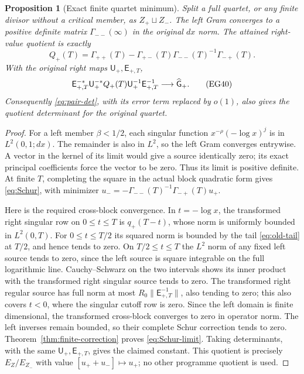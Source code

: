 \documentclass[11pt]{article}
\newtheorem{proposition}[theorem]{Proposition}
\newcommand{\U}{\mathsf U}\newcommand{\E}{\mathsf E}
\begin{document}
\begin{proposition}[Exact finite quartet minimum]\label{prop:left-minimum}
Split a full quartet, or any finite divisor without a critical member,
as $Z_+\sqcup Z_-$. The left Gram converges to a positive definite
matrix $\Gamma_{--}(\infty)$ in the original $dx$ norm. The attained
right-value quotient is exactly
\[
 Q_+(T)=\Gamma_{++}(T)-\Gamma_{+-}(T)
                     \Gamma_{--}(T)^{-1}\Gamma_{-+}(T).
 \tag{EG39}\label{eq:Schur}
\]
With the original right maps $\U_+,\E_{+,T}$,
\[
 \E_{+,T}^{-*}\U_+^{-*}Q_+(T)\U_+^{-1}\E_{+,T}^{-1}
                             \longrightarrow\widehat\G_+.
 \tag{EG40}\label{eq:Schur-limit}
\]
Consequently \eqref{eq:pair-det}, with its error term replaced by
$o(1)$, also gives the quotient determinant for the original quartet.
\end{proposition}
\begin{proof}
For a left member $\beta<1/2$, each singular function
$x^{-\rho}(-\log x)^j$ is in $L^2(0,1;dx)$. The remainder is also
in $L^2$, so the left Gram converges entrywise. A vector in the
kernel of its limit would give a source identically zero; its exact
principal coefficients force the vector to be zero. Thus its limit
is positive definite. At finite $T$, completing the square in the
actual block quadratic form gives \eqref{eq:Schur}, with minimizer
$u_-=-\Gamma_{--}(T)^{-1}\Gamma_{-+}(T)u_+$.

Here is the required cross-block convergence. In $t=-\log x$,
the transformed right singular row on $0\le t\le T$ is
$q_+(T-t)$, whose norm is uniformly bounded in $L^2(0,T)$.
For $0\le t\le T/2$ its squared norm is bounded by the tail
\eqref{eq:old-tail} at $T/2$, and hence tends to zero. On
$T/2\le t\le T$ the $L^2$ norm of any fixed left source tends
to zero, since the left source is square integrable on the full
logarithmic line. Cauchy--Schwarz on the two intervals shows its
inner product with the transformed right singular source tends
to zero. The transformed right regular source has full norm at
most $R_0\|\E_{+,T}^{-1}\|$, also tending to zero; this also
covers $t<0$, where the singular cutoff row is zero. Since the
left domain is finite dimensional, the transformed cross-block
converges to zero in operator norm. The left inverses remain
bounded, so their complete Schur correction tends to zero.
Theorem~\ref{thm:finite-correction} proves \eqref{eq:Schur-limit}.
Taking determinants, with the same $\U_+,\E_{+,T}$, gives the
claimed constant. This quotient is precisely $E_Z/E_{Z_-}$ with
value $[u_++u_-]\mapsto u_+$; no other programme quotient is used.
\end{proof}
\end{document}
